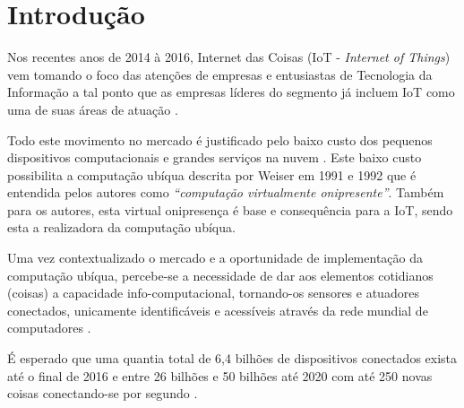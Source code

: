 \chapter[Introdução]{Introdução}

Nos recentes anos de 2014 à 2016, Internet das Coisas (IoT - \emph{Internet of
Things}) vem tomando o foco das atenções de empresas e entusiastas de Tecnologia
da Informação \cite{DzoneIoT:2015} a tal ponto que as empresas líderes do
segmento já incluem IoT como uma de suas áreas de atuação \cite{Ibm2016,
ARM-mbed, Microsoft2016, Intel2016, Oracle2016, Google2016, AmazonIoT2016}.

Todo este movimento no mercado é justificado pelo baixo custo dos pequenos
dispositivos computacionais \cite{RpiZeroLaunch, Esp8266.net} e grandes
serviços na nuvem \cite{Kaufmann2015, Amazon2016}. Este baixo custo
possibilita a computação ubíqua descrita por Weiser em 1991 e 1992
\cite{Weiser1999} que é entendida pelos autores como \emph{``computação
virtualmente onipresente''}. Também para os autores, esta virtual onipresença é
base e consequência para a IoT, sendo esta a realizadora da computação ubíqua.

Uma vez contextualizado o mercado e a oportunidade de implementação da
computação ubíqua, percebe-se a necessidade de dar aos elementos cotidianos
(coisas) a capacidade info-computacional, tornando-os sensores e atuadores
conectados, unicamente identificáveis e acessíveis através da rede mundial de
computadores \cite{Lemos2013, Kranenburg2012}.

É esperado que uma quantia total de 6,4 bilhões de dispositivos conectados
exista até o final de 2016 \cite{GARTNER2015} e entre 26 bilhões
\cite{GARTNER2014} e 50 bilhões até 2020 com até 250 novas coisas conectando-se
por segundo \cite{CiscoBlog2013}.
